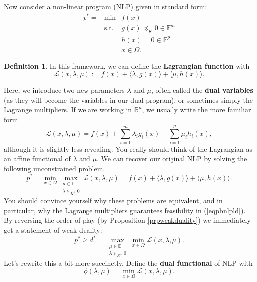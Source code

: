 \documentclass{article}
\numberwithin{equation}{section}
\theoremstyle{definition}
\newtheorem{definition}[theorem]{Definition}%
\newcommand{\bE}{\mathbb{E}}
\newcommand{\bR}{\mathbb{R}}
\newcommand{\cL}{\mathcal{L}}
\newcommand{\tst}{\text{s.t.}}
\begin{document}
Now consider a non-linear program (NLP) given in standard form:
\begin{equation}
    \label{eqpbnlpld}
    \begin{array}{ccc}
         p^*=&\min & f(x)  \\
         &\tst & g(x)\preceq_K 0\in\bE^m\\
          &    & h(x)=0\in\bE^p\\
           &   & x\in\Omega.
    \end{array}
\end{equation}
\begin{definition}
In this framework, we can define the \textbf{Lagrangian function} with
\begin{equation}
    \cL(x,\lambda,\mu):=f(x)+\langle \lambda, g(x)\rangle+\langle\mu, h(x)\rangle.
\end{equation}
\end{definition}
Here, we introduce two new parameters $\lambda$ and $\mu$, often called the \textbf{dual variables} (as they will become the variables in our dual program), or sometimes simply the Lagrange multipliers. If we are working in $\bR^n$, we usually write the more familiar form
\begin{equation}
    \cL(x,\lambda,\mu)=f(x)+\sum_{i=1}^m\lambda_ig_i(x)+\sum_{i=1}^p\mu_ih_i(x),
\end{equation}
although it is slightly less revealing. You really should think of the Lagrangian as an affine functional of $\lambda$ and $\mu$. We can recover our original NLP by solving the following unconstrained problem.
\begin{equation}
    p^*=\min_{x\in\Omega}\max_{\substack{\mu\in\bE\\\lambda\succeq_{K^+} 0 }}\cL(x,\lambda,\mu)=f(x)+\langle \lambda, g(x)\rangle+\langle\mu, h(x)\rangle.
\end{equation}
You should convince yourself why these problems are equivalent, and in particular, why the Lagrange multipliers guarantees feasibility in (\ref{eqpbnlpld}). By reversing the order of play (by Proposition \ref{prpweakduality}) we immediately get a statement of weak duality:
\begin{equation}
    \label{prelimweakduality}
    p^*\ge d^*=\max_{\substack{\mu\in\bE\\\lambda\succeq_{K^+} 0 }}\min_{x\in\Omega}\cL(x,\lambda,\mu).
\end{equation}
Let's rewrite this a bit more succinctly. Define the \textbf{dual functional} of NLP with
\begin{equation}
    \phi(\lambda,\mu)=\min_{x\in\Omega}\cL(x,\lambda,\mu).
\end{equation}
\end{document}
